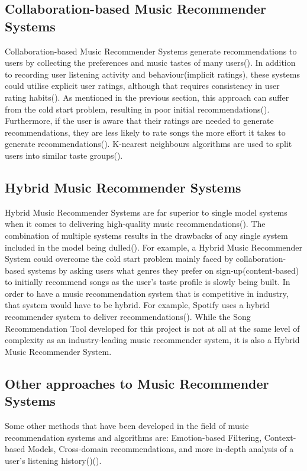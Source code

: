 \documentclass{l4proj}
\begin{document}
\subsection{Collaboration-based Music Recommender Systems}
Collaboration-based Music Recommender Systems generate recommendations to users by collecting the preferences and music tastes of many users(\cite{Paul_Kundu_2019}). In addition to recording user listening activity and behaviour(implicit ratings), these systems could utilise explicit user ratings, although that requires consistency in user rating habits(\cite{Paul_Kundu_2019}). As mentioned in the previous section, this approach can suffer from the cold start problem, resulting in poor initial recommendations(\cite{Paul_Kundu_2019}). Furthermore, if the user is aware that their ratings are needed to generate recommendations, they are less likely to rate songs the more effort it takes to generate recommendations(\cite{Paul_Kundu_2019}). K-nearest neighbours algorithms are used to split users into similar taste groups(\cite{Paul_Kundu_2019}).
\subsection{Hybrid Music Recommender Systems}
Hybrid Music Recommender Systems are far superior to single model systems when it comes to delivering high-quality music recommendations(\cite{Paul_Kundu_2019}). The combination of multiple systems results in the drawbacks of any single system included in the model being dulled(\cite{Paul_Kundu_2019}). For example, a Hybrid Music Recommender System could overcome the cold start problem mainly faced by collaboration-based systems by asking users what genres they prefer on sign-up(content-based) to initially recommend songs as the user's taste profile is slowly being built. In order to have a music recommendation system that is competitive in industry, that system would have to be hybrid. For example, Spotify uses a hybrid recommender system to deliver recommendations(\cite{Mohan_2023}). While the Song Recommendation Tool developed for this project is not at all at the same level of complexity as an industry-leading music recommender system, it is also a Hybrid Music Recommender System.
\subsection{Other approaches to Music Recommender Systems}
Some other methods that have been developed in the field of music recommendation systems and algorithms are: Emotion-based Filtering, Context-based Models, Cross-domain recommendations, and more in-depth analysis of a user's listening history(\cite{Paul_Kundu_2019})(\cite{Schedl_Zamani_Chen_Deldjoo_Elahi_2018}). 
\end{document}
